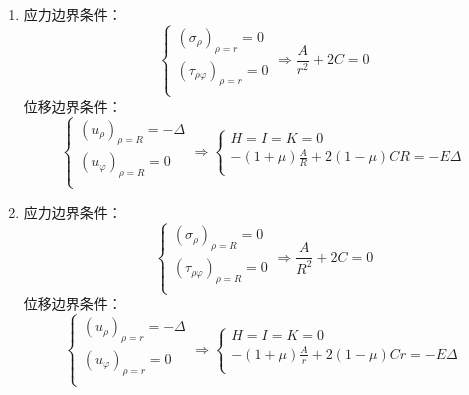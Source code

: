 \begin{remark}
\begin{enumerate}
				\item 应力边界条件：\[\begin{cases}
				\left( \sigma _{\rho} \right) _{\rho =r}=0\\
				\left( \tau _{\rho \varphi} \right) _{\rho =r}=0\\
				\end{cases}\Longrightarrow \frac{A}{r^2}+2C=0\]
				位移边界条件：\[\begin{cases}
				\left( u_{\rho} \right) _{\rho =R}=-\varDelta\\
				\left( u_{\varphi} \right) _{\rho =R}=0\\
				\end{cases}\Longrightarrow \begin{cases}
				H=I=K=0\\
				-\left( 1+\mu \right) \frac{A}{R}+2\left( 1-\mu \right) CR=-E\varDelta\\
				\end{cases}\]
				
				\item 应力边界条件：\[\begin{cases}
				\left( \sigma _{\rho} \right) _{\rho =R}=0\\
				\left( \tau _{\rho \varphi} \right) _{\rho =R}=0\\
				\end{cases}\Longrightarrow \frac{A}{R^2}+2C=0\]
				位移边界条件：$$\begin{cases}
					\left( u_{\rho} \right) _{\rho =r}=-\varDelta\\
					\left( u_{\varphi} \right) _{\rho =r}=0\\
				\end{cases}\Longrightarrow \begin{cases}
					H=I=K=0\\
					-\left( 1+\mu \right) \frac{A}{r}+2\left( 1-\mu \right) Cr=-E\varDelta\\
				\end{cases}$$
			\end{enumerate}
		\end{remark}
	
